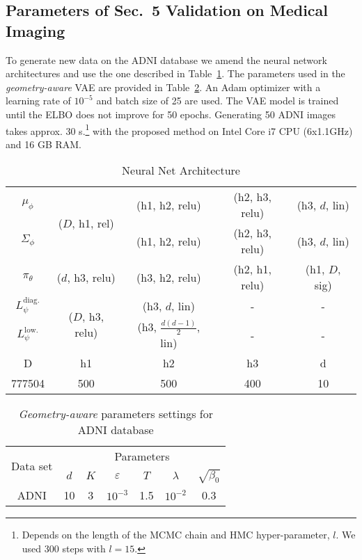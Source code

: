 \documentclass[10pt,journal,compsoc]{IEEEtran}
\begin{document}
\subsection{Parameters of Sec.~5 Validation on Medical Imaging}\label{appendix D.3}

To generate new data on the ADNI database we amend the neural network architectures and use the one described in Table~\ref{tab: app neural arch adni}. The parameters used in the \emph{geometry-aware} VAE are provided in Table~\ref{tab: app hyperparams adni}. An Adam optimizer with a learning rate of $10^{-5}$ and batch size of 25 are used. The VAE model is trained until the ELBO does not improve for 50 epochs. Generating 50 ADNI images takes approx. 30 s.\footnote{Depends on the length of the MCMC chain and HMC hyper-parameter, $l$. We used 300 steps with $l=15$.} with the proposed method on Intel Core i7 CPU (6x1.1GHz) and 16 GB RAM.

\begin{table}[!ht]
\caption{Neural Net Architecture}
    \centering
    \scriptsize
    \begin{tabular}{c|cccc}
    \hline
         $\mu_{\phi} $      &  \multirow{2}{*}{($D$, h1, rel)}  & (h1, h2, relu) & (h2, h3, relu) & (h3, $d$, lin)   \\
         $\Sigma_{\phi}$    &                                    & (h1, h2, relu) & (h2, h3, relu) & (h3, $d$, lin) \\
         \hline
         $ \pi_{\theta} $   &  ($d$, h3, relu)                  & (h3, h2, relu) & (h2, h1, relu) & (h1, $D$, sig)   \\
         \hline
        $L_{\psi}^{\text{diag.}}$  &  \multirow{2}{*}{($D$, h3, relu)}& (h3, $d$, lin)                 & - & - \\
        $L_{\psi}^{\text{low.}}$    &                                  & (h3, $\frac{d(d-1)}{2}$, lin) & - & - \\
        \hline
        \hline
        D &h1& h2 & h3 & d\\
        777504 & 500 & 500 & 400 & 10\\
        \hline
    \end{tabular}
    \label{tab: app neural arch adni}
\end{table}

\begin{table}[!ht]
  \centering
  \caption{\emph{Geometry-aware} parameters settings for ADNI database}
  \label{tab: app hyperparams adni}
  \begin{tabular}{c|cccccc}
  \hline
       \multirow{2}{*}{Data set} & \multicolumn{6}{c}{Parameters} \\
       & $d$ & $K$ & $\varepsilon$ & $T$ & $\lambda$ & $\sqrt{\beta_0}$   \\
      \hline
      ADNI       & 10 & 3 & $10^{-3}$ & 1.5 & $10^{-2}$ & 0.3 \\
      \hline
  \end{tabular}
\end{table}
\end{document}
